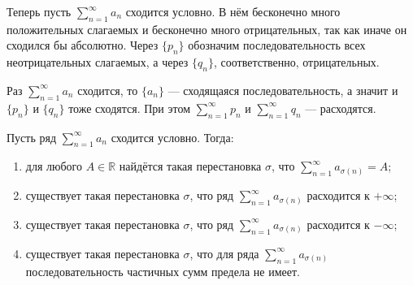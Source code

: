 \documentclass[a4paper, 12pt]{article}
\begin{document}
	
	Теперь пусть $\sum\limits_{n=1}^{\infty}a_n$ сходится условно. В нём бесконечно много положительных слагаемых и бесконечно много отрицательных, так как иначе он сходился бы абсолютно. Через $\{p_n\}$ обозначим последовательность всех неотрицательных слагаемых, а через $\{q_n\}$, соответственно, отрицательных. 
	
	Раз $\sum\limits_{n=1}^{\infty}a_n$ сходится, то $\{a_n\}$ --- сходящаяся последовательность, а значит и $\{p_n\}$ и $\{q_n\}$ тоже сходятся.
	При этом $\sum\limits_{n=1}^{\infty}p_n$ и $\sum\limits_{n=1}^{\infty}q_n$ --- расходятся.
	
	\begin{Theorem}[Римана]
		Пусть ряд $\sum\limits_{n=1}^{\infty}a_n$ сходится условно. Тогда:
		\begin{enumerate}
			\item для любого $A \in \mathbb{R}$ найдётся такая перестановка $\sigma$, что $\sum\limits_{n=1}^{\infty}a_{\sigma(n)} = A $;
			\item существует такая перестановка $\sigma$, что ряд $\sum\limits_{n=1}^{\infty}a_{\sigma(n)}$ расходится к $+\infty$;
			\item существует такая перестановка $\sigma$, что ряд $\sum\limits_{n=1}^{\infty}a_{\sigma(n)}$ расходится к $-\infty$;
			\item существует такая перестановка $\sigma$, что для ряда $\sum\limits_{n=1}^{\infty}a_{\sigma(n)}$ последовательность частичных сумм предела не имеет.
		\end{enumerate}
	\end{Theorem}
\end{document}
